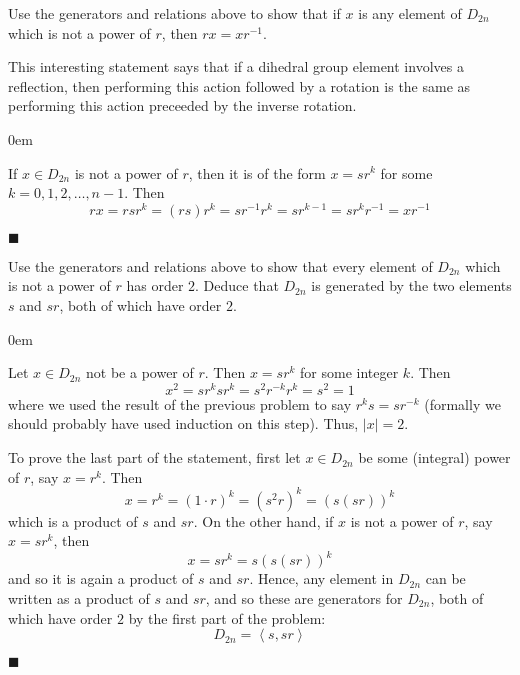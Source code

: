 \documentclass[12pt]{article}
\renewcommand{\qed}{\hfill$\blacksquare$}
\renewenvironment{proof}{\begin{addmargin}[1em]{0em}\begin{newproof}}{\end{newproof}\end{addmargin}\qed}
\newenvironment{problem}[2][Exercise]{\begin{trivlist}
\item[\hskip \labelsep {\bfseries #1}\hskip \labelsep {\bfseries #2.}]}{\end{trivlist}}
\begin{document}
\begin{problem}{1.2.2}
Use the generators and relations above to show that if $x$ is any element of $D_{2n}$ which is not a power of $r$, then $rx=xr^{-1}$.
\end{problem}
{\color{red} This interesting statement says that if a dihedral group element involves a reflection, then performing this action followed by a rotation is the same as performing this action preceeded by the inverse rotation.}
\begin{proof}
If $x\in D_{2n}$ is not a power of $r$, then it is of the form $x=sr^k$ for some $k=0,1,2,\ldots,n-1$. Then $$ rx = rsr^k = \left(rs\right)r^k = sr^{-1}r^k = sr^{k-1}=sr^{k}r^{-1}=xr^{-1} $$
\end{proof}

\begin{problem}{1.2.3}
Use the generators and relations above to show that every element of $D_{2n}$ which is not a power of $r$ has order $2$. Deduce that $D_{2n}$ is generated by the two elements $s$ and $sr$, both of which have order $2$.
\end{problem}
\begin{proof}
Let $x \in D_{2n}$ not be a power of $r$. Then $x=sr^k$ for some integer $k$. Then
$$ x^2 = sr^ksr^k = s^2 r^{-k}r^k = s^2 = 1 $$
where we used the result of the previous problem to say $r^ks=sr^{-k}$ (formally we should probably have used induction on this step). Thus, $\left|x\right|=2$.

To prove the last part of the statement, first let $x\in D_{2n}$ be some (integral) power of $r$, say $x=r^k$. Then
$$ x = r^k = \left(1\cdot r\right)^k = \left(s^2r\right)^k = \left(s\left(sr\right)\right)^k $$ which is a product of $s$ and $sr$. On the other hand, if $x$ is not a power of $r$, say $x=sr^k$, then
$$ x = sr^k = s\left(s\left(sr\right)\right)^k $$ and so it is again a product of $s$ and $sr$. Hence, any element in $D_{2n}$ can be written as a product of $s$ and $sr$, and so these are generators for $D_{2n}$, both of which have order $2$ by the first part of the problem:
$$ D_{2n}=\left\langle s,sr\right\rangle $$
\end{proof}
\end{document}
